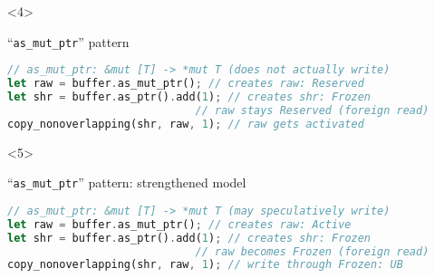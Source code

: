 \begin{frame}[fragile, t]
    \begin{onlyenv}<4>
        \begin{block}{{\cmark} ``\texttt{as\_mut\_ptr}'' pattern}
            \begin{lstlisting}[language=rust, basicstyle=\ttfamily\scriptsize]
// as_mut_ptr: &mut [T] -> *mut T (does not actually write)
let raw = buffer.as_mut_ptr(); // creates raw: Reserved
let shr = buffer.as_ptr().add(1); // creates shr: Frozen
                             // raw stays Reserved (foreign read)
copy_nonoverlapping(shr, raw, 1); // raw gets activated
            \end{lstlisting}
        \end{block}
    \end{onlyenv}

    \begin{onlyenv}<5>
        \begin{block}{{\xmark} ``\texttt{as\_mut\_ptr}'' pattern: strengthened model}
            \begin{lstlisting}[language=rust, basicstyle=\ttfamily\scriptsize]
// as_mut_ptr: &mut [T] -> *mut T (may speculatively write)
let raw = buffer.as_mut_ptr(); // creates raw: Active
let shr = buffer.as_ptr().add(1); // creates shr: Frozen
                             // raw becomes Frozen (foreign read)
copy_nonoverlapping(shr, raw, 1); // write through Frozen: UB
            \end{lstlisting}
        \end{block}
    \end{onlyenv}
\end{frame}


